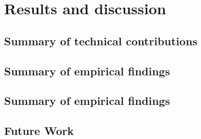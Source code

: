 
\chapter{Results and discussion}
\label{results}


\section{Summary of technical contributions}

\section{Summary of empirical findings}


\section{Summary of empirical findings}

\section{Future Work}
